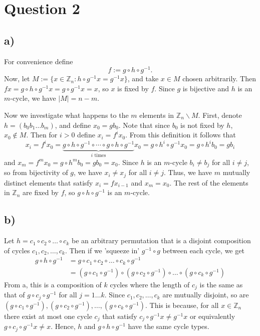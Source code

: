 \documentclass[a4paper,12pt]{article}
\begin{document}
\clearpage
\section*{Question 2}


\subsection*{a)}

For convenience define
\begin{equation*}
    f:=g\circ h\circ g^{-1}.
\end{equation*}
Now, let $M:=\{x\in\mathbb Z_n:h\circ g^{-1}x=g^{-1}x\}$, and take $x\in M$ chosen arbitrarily. Then $fx=g\circ h\circ g^{-1}x=g\circ g^{-1}x=x$, so $x$ is fixed by $f$. Since $g$ is bijective and $h$ is an $m$-cycle, we have $|M|=n-m$.

Now we investigate what happens to the $m$ elements in $\mathbb Z_n\backslash M$. First, denote $h=(b_0b_1\dots b_m)$, and define $x_0=gb_0$. Note that since $b_0$ is not fixed by $h$, $x_0\notin M$. Then for $i>0$ define $x_i=f^ix_0$. From this definition it follows that 
\begin{equation*}
    x_i=f^ix_0=\underbrace{g\circ h \circ g^{-1}\circ\cdots\circ g\circ h \circ g^{-1}}_{i\text{ times}} x_0=g\circ h^i\circ g^{-1} x_0= g\circ h^i b_0= g b_i
\end{equation*}
and $x_m=f^m x_0 = g\circ h^m b_0=gb_0=x_0$.
Since $h$ is an $m$-cycle $b_i\neq b_j$ for all $i\neq j$, so from bijectivity of $g$, we have $x_i\neq x_j$ for all $i\neq j$. Thus, we have $m$ mutually distinct elements that satisfy $x_i=fx_{i-1}$ and $x_m=x_0$. The rest of the elements in $\mathbb Z_n$ are fixed by $f$, so $g\circ h\circ g^{-1}$ is an $m$-cycle.

\subsection*{b)}
Let $h=c_1\circ c_2\circ\dots\circ c_k$ be an arbitrary permutation that is a disjoint composition of cycles $c_1,c_2,\dots,c_k$. Then if we 'squeeze in' $g^{-1}\circ g$ between each cycle, we get
\begin{align*}
    g \circ h\circ g^{-1} &= g \circ c_1 \circ c_2\circ\dots\circ c_k\circ g^{-1}\\
    &= (g \circ c_1\circ g^{-1}) \circ (g \circ c_2\circ g^{-1}) \circ \dots \circ (g\circ  c_k\circ g^{-1})
\end{align*}
From a, this is a composition of $k$ cycles where the length of $c_j$ is the same as that of $g\circ c_j \circ g^{-1}$ for all $j=1 \ldots k$. Since $c_1,c_2,\dots,c_k$ are mutually disjoint, so are $(g \circ c_1\circ g^{-1}), (g \circ c_2\circ g^{-1}) , \dots , (g\circ  c_k\circ g^{-1})$. This is because, for all $x\in\mathbb Z_n$ there exist at most one cycle $c_j$ that satisfy $c_j\circ g^{-1}x\neq g^{-1}x$ or equivalently $g\circ c_j\circ g^{-1}x\neq x$. Hence, $h$ and $g\circ h\circ g^{-1}$ have the same cycle types.
\end{document}
